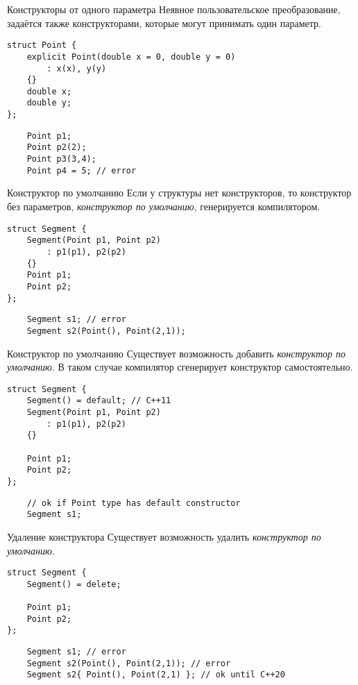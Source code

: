 \documentclass{beamer}
\begin{document}
\begin{frame}[fragile]{Конструкторы от одного параметра}
Неявное пользовательское преобразование, 
задаётся также конструкторами, которые могут принимать один параметр.
\begin{lstlisting}
struct Point {
    explicit Point(double x = 0, double y = 0) 
        : x(x), y(y)
    {}
    double x;
    double y;
};
\end{lstlisting}
\begin{lstlisting}
    Point p1;
    Point p2(2);
    Point p3(3,4);
    Point p4 = 5; // error
\end{lstlisting}
\end{frame}

\begin{frame}[fragile]{Конструктор по умолчанию}
    Если у структуры нет конструкторов, то конструктор 
    без параметров, {\em конструктор по умолчанию},
    генерируется компилятором.
\begin{lstlisting}
struct Segment {
    Segment(Point p1, Point p2) 
        : p1(p1), p2(p2)
    {}
    Point p1;
    Point p2;
};
\end{lstlisting}
\begin{lstlisting}
    Segment s1; // error
    Segment s2(Point(), Point(2,1));
\end{lstlisting}
\end{frame}

\begin{frame}[fragile]{Конструктор по умолчанию}
    Существует возможность добавить {\em конструктор по умолчанию}.
    В таком случае компилятор сгенерирует конструктор самостоятельно.
\begin{lstlisting}
struct Segment {
    Segment() = default; // C++11
    Segment(Point p1, Point p2) 
        : p1(p1), p2(p2)
    {}

    Point p1;
    Point p2;
};
\end{lstlisting}
\begin{lstlisting}
    // ok if Point type has default constructor
    Segment s1;
\end{lstlisting}
\end{frame}

\begin{frame}[fragile]{Удаление конструктора}
    Существует возможность удалить {\em конструктор по умолчанию}.
\begin{lstlisting}
struct Segment {
    Segment() = delete;

    Point p1;
    Point p2;
};
\end{lstlisting}
\begin{lstlisting}
    Segment s1; // error
    Segment s2(Point(), Point(2,1)); // error
    Segment s2{ Point(), Point(2,1) }; // ok until C++20
\end{lstlisting}
\end{frame}
\end{document}
